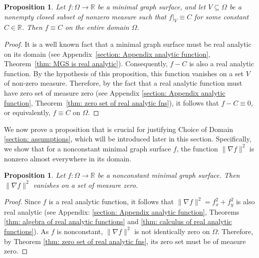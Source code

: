\documentclass[12pt]{article}
\theoremstyle{plain}
\newtheorem{proposition}[theorem]{Proposition}
\theoremstyle{definition}
\theoremstyle{remark}
\begin{document}
  \begin{proposition}
      \label{thm: MGS is non-constant almost everywhere}
      Let \( f : \Omega \longrightarrow \mathbb{R} \) be a minimal graph surface, and let \( V \subseteq \Omega \) be a nonempty closed subset of nonzero measure such that \( f|_V \equiv C \) for some constant \( C \in \mathbb{R} \). Then \( f \equiv C \) on the entire domain \( \Omega \).
  \end{proposition}
  
  \begin{proof}
  	 It is a well known fact that a minimal graph surface must be real analytic on its domain (see Appendix~\ref{section: Appendix analytic function}, Theorem~\ref{thm: MGS is real analytic}). Consequently, \(f - C\) is also a real analytic function. By the hypothesis of this proposition, this function vanishes on a set \(V\) of non‑zero measure. Therefore, by the fact that a real analytic function must have zero set of measure zero (see Appendix \ref{section: Appendix analytic function}, Theorem~\ref{thm: zero set of real analytic fns}), it follows that \(f - C \equiv 0\), or equivalently, \(f \equiv C\) on \(\Omega\).
  \end{proof}
  
  We now prove a proposition that is crucial for justifying Choice of Domain \ref{section: assumptions}, which will be introduced later in this section. Specifically, we show that for a nonconstant minimal graph surface \(f\), the function \(\|\nabla f\|^2\) is nonzero almost everywhere in its domain.
  
  \begin{proposition}
  	\label{thm: f_x^2+f_y^2 is nonzero almost everywhere}
  	Let \( f : \Omega \longrightarrow \mathbb{R} \) be a nonconstant minimal graph surface. Then \(\|\nabla f\|^2\) vanishes on a set of measure zero.
  \end{proposition}
  
  \begin{proof}
  	Since \(f\) is a real analytic function, it follows that \(\|\nabla f\|^2 = f_x^2 + f_y^2\) is also real analytic (see Appendix: \ref{section: Appendix analytic function}, Theorems \ref{thm: algebra of real analytic functions} and \ref{thm: calculus of real analytic functions}). As \(f\) is nonconstant, \(\|\nabla f\|^2\) is not identically zero on \(\Omega\). Therefore, by Theorem \ref{thm: zero set of real analytic fns}, its zero set must be of measure zero.
  \end{proof}
\end{document}
